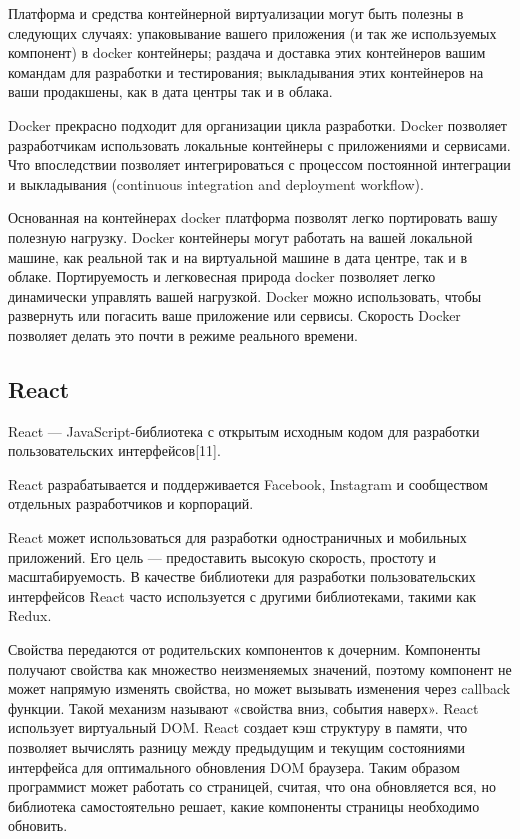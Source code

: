 Платформа и средства контейнерной виртуализации могут быть полезны в следующих случаях: упаковывание вашего приложения (и так же используемых компонент) в docker контейнеры; раздача и доставка этих контейнеров вашим командам для разработки и тестирования; выкладывания этих контейнеров на ваши продакшены, как в дата центры так и в облака.

Docker прекрасно подходит для организации цикла разработки.
Docker позволяет разработчикам использовать локальные контейнеры с приложениями и сервисами. Что впоследствии позволяет интегрироваться с процессом постоянной интеграции и выкладывания (continuous integration and deployment workflow).

Основанная на контейнерах docker платформа позволят легко портировать вашу полезную нагрузку.
Docker контейнеры могут работать на вашей локальной машине, как реальной так и на виртуальной машине в дата центре, так и в облаке.
Портируемость и легковесная природа docker позволяет легко динамически управлять вашей нагрузкой.
Docker можно использовать, чтобы развернуть или погасить ваше приложение или сервисы. Скорость Docker позволяет делать это почти в режиме реального времени.

\subsection{React}
React — JavaScript-библиотека с открытым исходным кодом для разработки пользовательских интерфейсов[11].

React разрабатывается и поддерживается Facebook, Instagram и сообществом отдельных разработчиков и корпораций.

React может использоваться для разработки одностраничных и мобильных приложений. Его цель — предоставить высокую скорость, простоту и масштабируемость.
В качестве библиотеки для разработки пользовательских интерфейсов React часто используется с другими библиотеками, такими как Redux.

Свойства передаются от родительских компонентов к дочерним.
Компоненты получают свойства как множество неизменяемых значений, поэтому компонент не может напрямую изменять свойства, но может вызывать изменения через callback функции.
Такой механизм называют «свойства вниз, события наверх».
React использует виртуальный DOM. React создает кэш структуру в памяти, что позволяет вычислять разницу между предыдущим и текущим состояниями интерфейса для оптимального обновления DOM браузера.
Таким образом программист может работать со страницей, считая, что она обновляется вся, но библиотека самостоятельно решает, какие компоненты страницы необходимо обновить.

